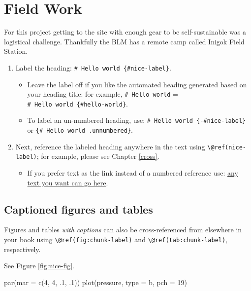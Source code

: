 \documentclass[
]{book}
\newenvironment{Shaded}{\begin{snugshade}}{\end{snugshade}}
\newcommand{\AttributeTok}[1]{\textcolor[rgb]{0.77,0.63,0.00}{#1}}
\newcommand{\DecValTok}[1]{\textcolor[rgb]{0.00,0.00,0.81}{#1}}
\newcommand{\FunctionTok}[1]{\textcolor[rgb]{0.00,0.00,0.00}{#1}}
\newcommand{\NormalTok}[1]{#1}
\newcommand{\StringTok}[1]{\textcolor[rgb]{0.31,0.60,0.02}{#1}}
\providecommand{\tightlist}{%
  \setlength{\itemsep}{0pt}\setlength{\parskip}{0pt}}
\theoremstyle{definition}
\theoremstyle{definition}
\theoremstyle{definition}
\theoremstyle{definition}
\theoremstyle{remark}
\begin{document}
\hypertarget{field-work}{%
\chapter{Field Work}\label{field-work}}

For this project getting to the site with enough gear to be self-sustainable was a logistical challenge. Thankfully the BLM has a remote camp called Inigok Field Station.

\begin{enumerate}
\def\labelenumi{\arabic{enumi}.}
\tightlist
\item
  Label the heading: \texttt{\#\ Hello\ world\ \{\#nice-label\}}.

  \begin{itemize}
  \tightlist
  \item
    Leave the label off if you like the automated heading generated based on your heading title: for example, \texttt{\#\ Hello\ world} = \texttt{\#\ Hello\ world\ \{\#hello-world\}}.
  \item
    To label an un-numbered heading, use: \texttt{\#\ Hello\ world\ \{-\#nice-label\}} or \texttt{\{\#\ Hello\ world\ .unnumbered\}}.
  \end{itemize}
\item
  Next, reference the labeled heading anywhere in the text using \texttt{\textbackslash{}@ref(nice-label)}; for example, please see Chapter \ref{cross}.

  \begin{itemize}
  \tightlist
  \item
    If you prefer text as the link instead of a numbered reference use: \protect\hyperlink{cross}{any text you want can go here}.
  \end{itemize}
\end{enumerate}

\hypertarget{captioned-figures-and-tables}{%
\section{Captioned figures and tables}\label{captioned-figures-and-tables}}

Figures and tables \emph{with captions} can also be cross-referenced from elsewhere in your book using \texttt{\textbackslash{}@ref(fig:chunk-label)} and \texttt{\textbackslash{}@ref(tab:chunk-label)}, respectively.

See Figure \ref{fig:nice-fig}.

\begin{Shaded}
\begin{Highlighting}[]
\FunctionTok{par}\NormalTok{(}\AttributeTok{mar =} \FunctionTok{c}\NormalTok{(}\DecValTok{4}\NormalTok{, }\DecValTok{4}\NormalTok{, .}\DecValTok{1}\NormalTok{, .}\DecValTok{1}\NormalTok{))}
\FunctionTok{plot}\NormalTok{(pressure, }\AttributeTok{type =} \StringTok{\textquotesingle{}b\textquotesingle{}}\NormalTok{, }\AttributeTok{pch =} \DecValTok{19}\NormalTok{)}
\end{Highlighting}
\end{Shaded}
\end{document}
